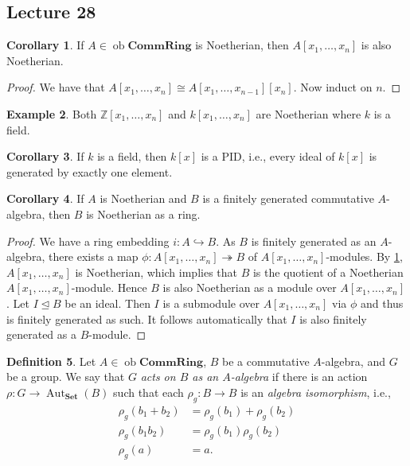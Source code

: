 \documentclass[10pt,letterpaper,cm]{nupset}
\theoremstyle{definition}
\newtheorem{definition}{Definition}[subsection]
\newtheorem{exmp}[definition]{Example}
\theoremstyle{theorem}
\newtheorem{corollary}[definition]{Corollary}
\theoremstyle{remark}
\newcommand{\Z}{\mathbb Z}
\newcommand{\1}{\mathbf{1}}
\newcommand{\0}{\vec 0}
\DeclareMathOperator{\aut}{Aut}
\DeclareMathOperator{\ob}{ob}
\begin{document}
\subsection{Lecture 28}

\begin{corollary}\label{pc2}
If $A \in \ob \mathbf{CommRing}$ is Noetherian, then $A[x_1, \ldots, x_n]$ is also Noetherian.
\end{corollary}
\begin{proof}
We have that $A[x_1, \ldots, x_n] \cong A[x_1, \ldots, x_{n-1}][x_n]$. Now induct on $n$.
\end{proof}

\begin{exmp}
Both $\Z[x_1, \ldots, x_n]$ and $k[x_1, \ldots, x_n]$ are Noetherian where $k$ is a field.
\end{exmp}

\begin{corollary}
If $k$ is a field, then $k[x]$ is a PID, i.e., every ideal of $k[x]$ is generated by exactly one element.
\end{corollary}

\begin{corollary}
If $A$ is Noetherian and $B$ is a finitely generated commutative $A$-algebra, then $B$ is Noetherian as a ring.
\end{corollary}
\begin{proof}
We have a ring embedding $i: A \hookrightarrow B$. As $B$ is finitely generated as an $A$-algebra, there exists a map $\phi: A[x_1, \ldots, x_n] \twoheadrightarrow B$ of $A[x_1, \ldots, x_n]$-modules. By \cref{pc2}, $A[x_1, \ldots, x_n]$ is Noetherian, which implies that $B$ is the quotient of a Noetherian $A[x_1, \ldots, x_n]$-module. Hence $B$ is also Noetherian as a module over $A[x_1, \ldots, x_n]$. Let $I\unlhd B$ be an ideal. Then $I$ is a submodule over $A[x_1, \ldots, x_n]$ via $\phi$ and thus is finitely generated as such. It follows automatically that $I$ is also finitely generated as a $B$-module.
\end{proof}

\bigskip

\begin{definition}
Let $A \in \ob \mathbf{CommRing}$, $B$ be a commutative $A$-algebra, and $G$ be a group. We say that $G$ \textit{acts on $B$ as an $A$-algebra} if there is an action $\rho : G \to \aut_{\mathbf{Set}}(B)$ such that each  $\rho_g  : B \to B$ is an \textit{algebra isomorphism}, i.e., 
\begin{align*}
  \rho_g(b_1 +b_2) & = \rho_g(b_1) + \rho_g(b_2)
\\  \rho_g(b_1b_2) & = \rho_g(b_1)\rho_g(b_2)
\\  \rho_g(a) & = a
.\end{align*}
\end{definition}
\end{document}
